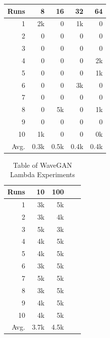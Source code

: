 \documentclass[a4paper, titlepage]{article}
\begin{document}
\begin{appendices}
\begin{table}[ht]
\begin{center}
\begin{tabular}{ r | r | r | r | r }
        Runs & 8 & 16 & 32 & 64 \\
        \hline
        1 & 2k & 0 & 1k & 0 \\
        2 & 0 & 0 & 0 & 0 \\
        3 & 0 & 0 & 0 & 0 \\
        4 & 0 & 0 & 0 & 2k \\
        5 & 0 & 0 & 0 & 1k \\
        6 & 0 & 0 & 3k & 0 \\
        7 & 0 & 0 & 0 & 0 \\
        8 & 0 & 5k & 0 & 1k \\
        9 & 0 & 0 & 0 & 0 \\
        10 & 1k & 0 & 0 & 0k \\
        \hline
        Avg. & 0.3k & 0.5k & 0.4k & 0.4k \\
        
      \end{tabular}
    \end{center}
    
  \end{table}

  \begin{table}[ht]
    
    \caption{Table of WaveGAN Lambda Experiments}
    \label{tab:WGAN_LAM}
    
    \begin{center}
      \begin{tabular}{ r | r | r | r | r }
        
        Runs & 10 & 100 \\
        \hline
        1 & 3k & 5k \\
        2 & 3k & 4k \\
        3 & 5k & 3k \\
        4 & 4k & 5k \\
        5 & 4k & 5k \\
        6 & 3k & 5k \\
        7 & 5k & 5k \\
        8 & 3k & 5k \\
        9 & 4k & 5k \\
        10 & 4k & 5k \\
        \hline
        Avg. & 3.7k & 4.5k \\
        
      \end{tabular}
    \end{center}
    

\end{table}
\end{appendices}
\end{document}
